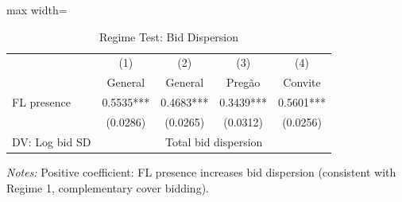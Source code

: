 \begin{table}[htbp]
\centering
\caption{Regime Test: Bid Dispersion}
\label{tab:regime_test}
\begin{adjustbox}{max width=\textwidth}
\begin{threeparttable}
\small
\begin{tabular}{lcccc}
\toprule
 & (1) & (2) & (3) & (4) \\
 & General & General & Preg\~{a}o & Convite \\
\midrule
FL presence & 0.5535*** & 0.4683*** & 0.3439*** & 0.5601*** \\
 & (0.0286) & (0.0265) & (0.0312) & (0.0256) \\
\midrule
DV: Log bid SD & \multicolumn{4}{c}{Total bid dispersion} \\
\bottomrule
\end{tabular}
\begin{tablenotes}
\small
\item \textit{Notes:} Positive coefficient: FL presence increases bid dispersion
(consistent with Regime 1, complementary cover bidding).
\end{tablenotes}
\end{threeparttable}
\end{adjustbox}
\end{table}
